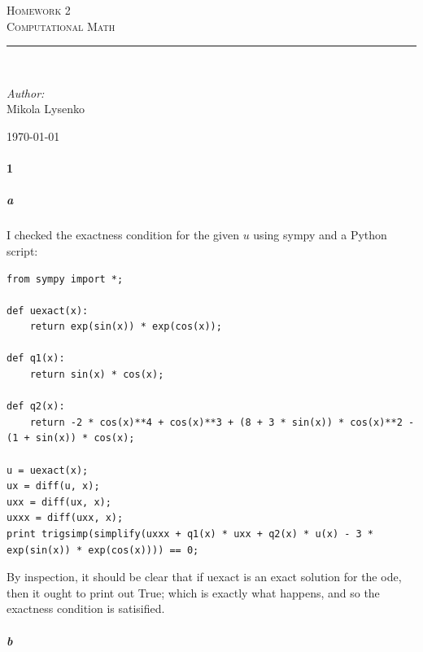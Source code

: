 \documentclass{article}
\newcommand{\HRule}{\rule{\linewidth}{0.5mm}}
\begin{document}
\begin{titlepage}
 
\begin{center}
 
\textsc{\LARGE Homework 2}\\[1.5cm] 

\textsc{\Large Computational Math}\\[0.5cm]
 
 
\HRule \\[2cm]
 
\begin{minipage}{0.4\textwidth}
\begin{flushleft} \large
\emph{Author:}\\
Mikola Lysenko
\end{flushleft}
\end{minipage}
 
\vfill
 
{\large \today}
 
\end{center}
 
\end{titlepage}


\paragraph{1}

\subparagraph{a}

I checked the exactness condition for the given $u$ using sympy and a Python script:

\begin{verbatim}
from sympy import *;

def uexact(x):
	return exp(sin(x)) * exp(cos(x));
	
def q1(x):
	return sin(x) * cos(x);
	
def q2(x):
	return -2 * cos(x)**4 + cos(x)**3 + (8 + 3 * sin(x)) * cos(x)**2 - (1 + sin(x)) * cos(x);

u = uexact(x);
ux = diff(u, x);
uxx = diff(ux, x);
uxxx = diff(uxx, x);
print trigsimp(simplify(uxxx + q1(x) * uxx + q2(x) * u(x) - 3 * exp(sin(x)) * exp(cos(x)))) == 0;
\end{verbatim}

By inspection, it should be clear that if uexact is an exact solution for the ode, then it ought to print out True; which is exactly what happens, and so the exactness condition is satisified.

\subparagraph{b}
\end{document}
